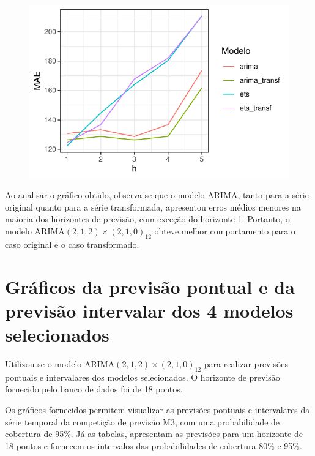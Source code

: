 \documentclass[
  letterpaper,
  DIV=11,
  numbers=noendperiod]{scrartcl}
\begin{document}
\begin{figure}

{\centering \includegraphics{T2_grupo5_files/figure-pdf/performance-1.pdf}

}

\end{figure}

Ao analisar o gráfico obtido, observa-se que o modelo ARIMA, tanto para
a série original quanto para a série transformada, apresentou erros
médios menores na maioria dos horizontes de previsão, com exceção do
horizonte 1. Portanto, o modelo
\(\text{ARIMA}(2,1,2)\times(2,1,0)_{12}\) obteve melhor comportamento
para o caso original e o caso transformado.

\hypertarget{gruxe1ficos-da-previsuxe3o-pontual-e-da-previsuxe3o-intervalar-dos-4-modelos-selecionados}{%
\section{Gráficos da previsão pontual e da previsão intervalar dos 4
modelos
selecionados}\label{gruxe1ficos-da-previsuxe3o-pontual-e-da-previsuxe3o-intervalar-dos-4-modelos-selecionados}}

Utilizou-se o modelo \(\text{ARIMA}(2,1,2)\times(2,1,0)_{12}\) para
realizar previsões pontuais e intervalares dos modelos selecionados. O
horizonte de previsão fornecido pelo banco de dados foi de 18 pontos.

Os gráficos fornecidos permitem visualizar as previsões pontuais e
intervalares da série temporal da competição de previsão M3, com uma
probabilidade de cobertura de 95\%. Já as tabelas, apresentam as
previsões para um horizonte de 18 pontos e fornecem os intervalos das
probabilidades de cobertura 80\% e 95\%.
\end{document}
